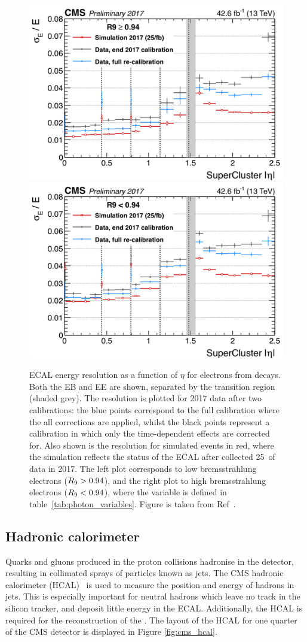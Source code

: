 \begin{figure}[htb!]
  \centering
  \includegraphics[width=.49\textwidth]{Figures/cms/2017_resolution_highR9.png}
  \includegraphics[width=.49\textwidth]{Figures/cms/2017_resolution_lowR9.png}
  \caption[ECAL energy resolution in 2017 data]
  {
    ECAL energy resolution as a function of $\eta$ for electrons from \Zee decays. Both the EB and EE are shown, separated by the transition region (shaded grey). The resolution is plotted for 2017 data after two calibrations: the blue points correspond to the full calibration where the all corrections are applied, whilst the black points represent a calibration in which only the time-dependent effects are corrected for. Also shown is the resolution for simulated \Zee events in red, where the simulation reflects the status of the ECAL after collected 25~\fbinv of data in 2017. The left plot corresponds to low bremsstrahlung electrons ($R_9>0.94$), and the right plot to high bremsstrahlung electrons ($R_9<0.94$), where the variable \RNINE is defined in table~\ref{tab:photon_variables}. Figure is taken from Ref~\cite{CMS-DP-2018-015}.
  }
  \label{fig:ecal_energy_resolution}
\end{figure}

\subsection{Hadronic calorimeter}\label{sec:cms_hcal}
Quarks and gluons produced in the proton collisions hadronise in the detector, resulting in collimated sprays of particles known as jets. The CMS hadronic calorimeter (HCAL)~\cite{Chatrchyan:2008zzk,CMS:1997xji} is used to measure the position and energy of hadrons in jets. This is especially important for neutral hadrons which leave no track in the silicon tracker, and deposit little energy in the ECAL. Additionally, the HCAL is required for the reconstruction of the \met. The layout of the HCAL for one quarter of the CMS detector is displayed in Figure \ref{fig:cms_hcal}.

